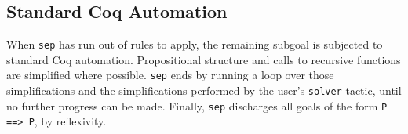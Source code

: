 \documentclass[preprint,nocopyrightspace]{sigplanconf}
\newcommand{\cd}[1]{\texttt{#1}}
\newcommand{\emp}{\mathbf{emp}}
\begin{document}

\subsection{Standard Coq Automation}

When \cd{sep} has run out of rules to apply, the remaining subgoal is subjected to standard Coq automation.  Propositional structure and calls to recursive functions are simplified where possible.  \cd{sep} ends by running a loop over those simplifications and the simplifications performed by the user's \cd{solver} tactic, until no further progress can be made.  Finally, \cd{sep} discharges all goals of the form \cd{P ==> P}, by reflexivity.
\end{document}
